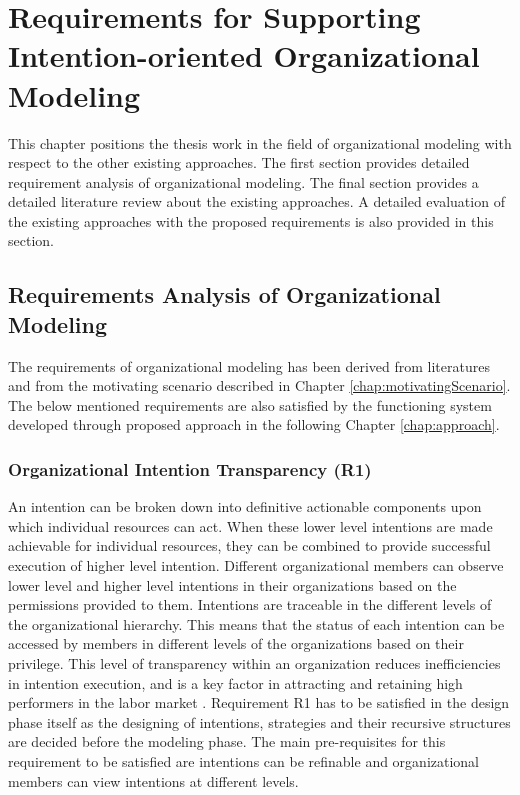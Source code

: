 \chapter{Requirements for Supporting Intention-oriented Organizational Modeling}
\label{chap:analysis}
This chapter positions the thesis work in the field of organizational modeling with respect to the other existing approaches. The first section provides detailed requirement analysis of organizational modeling. The final section provides a detailed literature review about the existing approaches. A detailed evaluation of the existing approaches with the proposed requirements is also provided in this section.

\section{Requirements Analysis of Organizational Modeling}
\label{sec:requirementssupoorting}
The requirements of organizational modeling has been derived from literatures \cite{McManus2007, Mandic2010 ,Bleistein2006, Lacom, Brambilla2012} and from the motivating scenario described in Chapter \ref{chap:motivatingScenario}. The below mentioned requirements are also satisfied by the functioning system developed through proposed approach in the following Chapter \ref{chap:approach}.

\subsection{Organizational Intention Transparency (R1)}
An intention can be broken down into definitive actionable components upon which individual resources can act. When these lower level intentions are made achievable for individual resources, they can be combined to provide successful execution of higher level intention. Different organizational members can observe lower level and higher level intentions in their organizations based on the permissions provided to them. Intentions are traceable in the different levels of the organizational hierarchy. This means that the status of each intention can be accessed by members in different levels of the organizations based on their privilege. This level of transparency within an organization reduces inefficiencies in intention execution, and is a key factor in attracting and retaining high performers in the labor market \cite{McManus2007}. Requirement R1 has to be satisfied in the design phase itself as the designing of intentions, strategies and their recursive structures are decided before the modeling phase. The main pre-requisites for this requirement to be satisfied are intentions can be refinable and organizational members can view intentions at different levels. 

